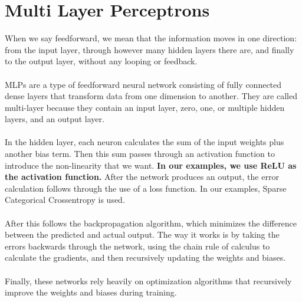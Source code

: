 \documentclass[11pt, letterpaper]{article}
\begin{document}
\section*{Multi Layer Perceptrons}
When we say feedforward, we mean that the information moves in one direction: from the input layer, through however many hidden layers there are, and finally to the output layer, without any looping or feedback. \\ \\
MLPs are a type of feedforward neural network consisting of fully connected dense layers that transform data from one dimension to another. They are called multi-layer because they contain an input layer, zero, one, or multiple hidden layers, and an output layer. \\ \\
In the hidden layer, each neuron calculates the sum of the input weights plus another bias term. Then this sum passes through an activation function to introduce the non-linearity that we want. \textbf{In our examples, we use ReLU as the activation function.} After the network produces an output, the error calculation follows through the use of a loss function. In our examples, Sparse Categorical Crossentropy is used. \\ \\
After this follows the backpropagation algorithm, which minimizes the difference between the predicted and actual output. The way it works is by taking the errors backwards through the network, using the chain rule of calculus to calculate the gradients, and then recursively updating the weights and biases. \\ \\
Finally, these networks rely heavily on optimization algorithms that recursively improve the weights and biases during training.

\newpage
\end{document}

